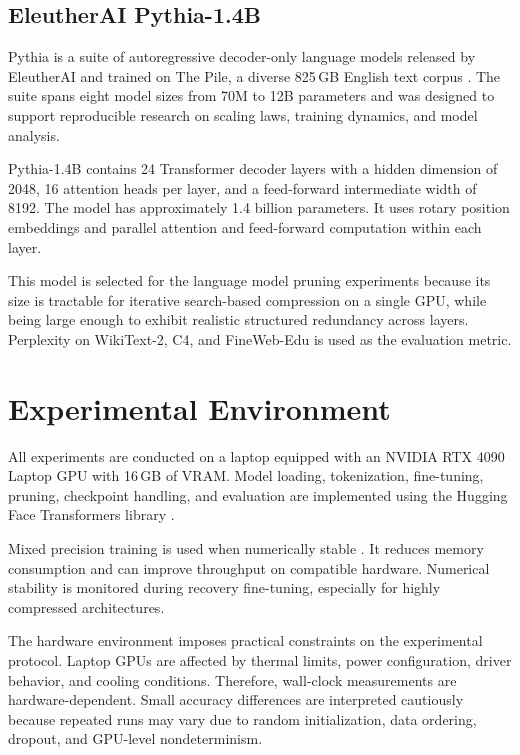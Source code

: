 \subsection{EleutherAI Pythia-1.4B}
\label{subsec:pythia}

Pythia is a suite of autoregressive decoder-only language models released by EleutherAI and trained on The Pile, a diverse 825\,GB English text corpus \citep{biderman2023pythia}. The suite spans eight model sizes from 70M to 12B parameters and was designed to support reproducible research on scaling laws, training dynamics, and model analysis.

Pythia-1.4B contains 24 Transformer decoder layers with a hidden dimension of 2048, 16 attention heads per layer, and a feed-forward intermediate width of 8192. The model has approximately 1.4 billion parameters. It uses rotary position embeddings and parallel attention and feed-forward computation within each layer.

This model is selected for the language model pruning experiments because its size is tractable for iterative search-based compression on a single GPU, while being large enough to exhibit realistic structured redundancy across layers. Perplexity on WikiText-2, C4, and FineWeb-Edu is used as the evaluation metric.

\section{Experimental Environment}
\label{sec:experimental-environment}

All experiments are conducted on a laptop equipped with an NVIDIA RTX 4090 Laptop GPU with 16\,GB of VRAM. Model loading, tokenization, fine-tuning, pruning, checkpoint handling, and evaluation are implemented using the Hugging Face Transformers library \citep{wolf2020transformers}.

Mixed precision training is used when numerically stable \citep{micikevicius2018mixed}. It reduces memory consumption and can improve throughput on compatible hardware. Numerical stability is monitored during recovery fine-tuning, especially for highly compressed architectures.

The hardware environment imposes practical constraints on the experimental protocol. Laptop GPUs are affected by thermal limits, power configuration, driver behavior, and cooling conditions. Therefore, wall-clock measurements are hardware-dependent. Small accuracy differences are interpreted cautiously because repeated runs may vary due to random initialization, data ordering, dropout, and GPU-level nondeterminism.

